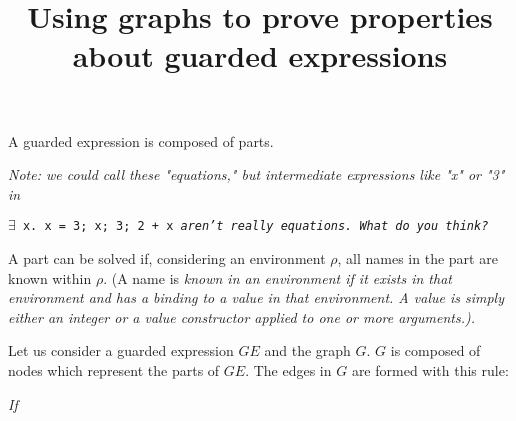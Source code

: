 \documentclass{article}
\title{Using graphs to prove properties about guarded expressions}
\begin{document}
\maketitle

A guarded expression is composed of parts. 

\bigskip

\it{Note: we could call these "equations," but intermediate expressions like 
"x" or "3" in} 

\tt{$\exists$ x. x = 3; x; 3; 2 + x}
\it{aren't really equations. What do you think?}

\bigskip

A part can be solved if, considering an environment $\rho$, 
all names in the part are known within $\rho$. (A name is 
\it{known} in an environment if it exists in that environment 
and has a binding to a value in that environment. A \it{value} 
is simply either an integer or a value constructor applied 
to one or more arguments.). 

\bigskip

Let us consider a guarded expression $GE$ and the graph $G$. $G$ is 
composed of nodes which represent the parts of $GE$. The edges in $G$
are formed with this rule:

\it{If }
\end{document}
